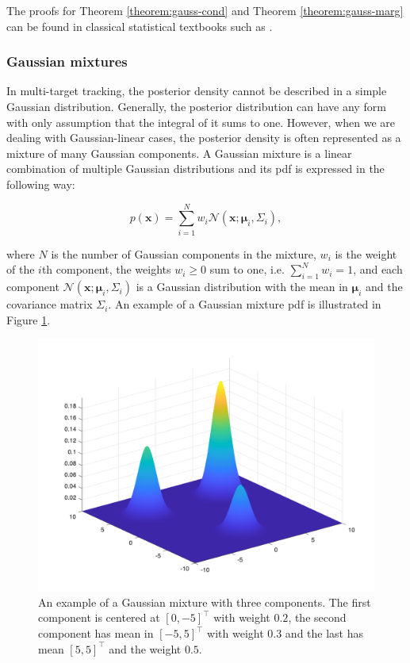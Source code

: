 The proofs for Theorem \ref{theorem:gauss-cond} and Theorem \ref{theorem:gauss-marg} can be found in classical statistical textbooks such as \cite[161--163]{johnsonAppliedMultivariateStatistical2007}.

\subsubsection{Gaussian mixtures}

In multi-target tracking, the posterior density cannot be described in a simple Gaussian distribution. Generally, the posterior distribution can have any form with only assumption that the integral of it sums to one. However, when we are dealing with Gaussian-linear cases, the posterior density is often represented as a mixture of many Gaussian components. A Gaussian mixture is a linear combination of multiple Gaussian distributions and its pdf is expressed in the following way:

\begin{equation}\label{eq:gaussian-mixture}
    p(\mathbf{x}) = \sum_{i=1}^N w_i \mathscr{N}\left(\mathbf{x}; \boldsymbol{\mu}_i, \Sigma_i\right),
\end{equation}

where $N$ is the number of Gaussian components in the mixture, $w_i$ is the weight of the $i$th component, the weights $w_i \geq 0$ sum to one, i.e. $\sum_{i=1}^N w_i = 1$, and each component $\mathscr{N}\left(\mathbf{x}; \boldsymbol{\mu}_i, \Sigma_i\right)$ is a Gaussian distribution with the mean in $\boldsymbol{\mu}_i$ and the covariance matrix $\Sigma_i$. An example of a Gaussian mixture pdf is illustrated in Figure \ref{fig:gaussian-mixture}.

\begin{figure}
\centering
  \includegraphics[width=.4\linewidth]{figures/gaussian-mixture.png}
  \caption{An example of a Gaussian mixture with three components. The first component is centered at $[0, -5]^\intercal$ with weight $0.2$, the second component has mean in $[-5, 5]^\intercal$ with weight $0.3$ and the last has mean $[5, 5]^\intercal$ and the weight $0.5$.}
  \label{fig:gaussian-mixture}
\end{figure}

